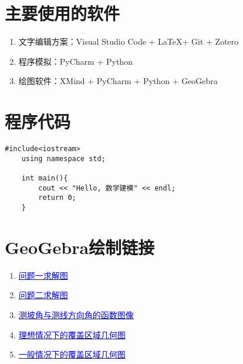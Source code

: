


\nocite{*}


\appendix
\section{主要使用的软件}

\begin{enumerate}
    \item 文字编辑方案：Visual Studio Code + \LaTeX + Git + Zotero
    \item 程序模拟：PyCharm + Python
    \item 绘图软件：XMind + PyCharm + Python + GeoGebra
\end{enumerate}

\section{程序代码}

\begin{lstlisting}[caption={类的定义语句}]
    #include<iostream>
    using namespace std;

    int main(){
        cout << "Hello, 数学建模" << endl;
        return 0;
    }
\end{lstlisting}

\section{GeoGebra绘制链接}

\begin{enumerate}
    \item \href{https://www.geogebra.org/m/hpkkarys}{\textcolor{blue}{问题一求解图}}
    \item \href{https://www.geogebra.org/m/f6kfjvru}{\textcolor{blue}{问题二求解图}}
    \item \href{https://www.geogebra.org/m/n8saurfn}{\textcolor{blue}{测坡角与测线方向角的函数图像}}
    \item \href{https://www.geogebra.org/m/xcvstdzg}{\textcolor{blue}{理想情况下的覆盖区域几何图}}
    \item \href{https://www.geogebra.org/m/absuxwpk}{\textcolor{blue}{一般情况下的覆盖区域几何图}}
\end{enumerate}
